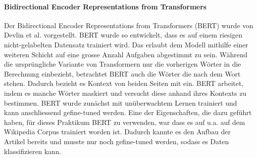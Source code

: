 \paragraph{Bidirectional Encoder Representations from Transformers}
Der Bidirectional Encoder Representations from Transformers (BERT) wurde von Devlin et al.  \cite{BERTReference} vorgestellt. BERT wurde so entwickelt, dass es auf einem riesigen nicht-gelabelten Datensatz trainiert wird. Das erlaubt dem Modell mithilfe einer weiteren Schicht auf eine grosse Anzahl Aufgaben abgestimmt zu sein. Während die ursprüngliche Variante von Transformern nur die vorherigen Wörter in die Berechnung einbezieht, betrachtet BERT auch die Wörter die nach dem Wort stehen. Dadurch bezieht es Kontext von beiden Seiten mit ein. BERT arbeitet, indem es manche Wörter maskiert und versucht diese anhand ihres Kontexts zu bestimmen. BERT wurde zunächst mit unüberwachtem Lernen trainiert und kann anschliessend gefine-tuned werden. Eine der Eigenschaften, die dazu geführt haben, für dieses Praktikum BERT zu verwenden, war dass es auf u.a. auf dem Wikipedia Corpus trainiert worden ist. Dadurch kannte es den Aufbau der Artikel bereits und musste nur noch gefine-tuned werden, sodass es Daten klassifizieren kann.